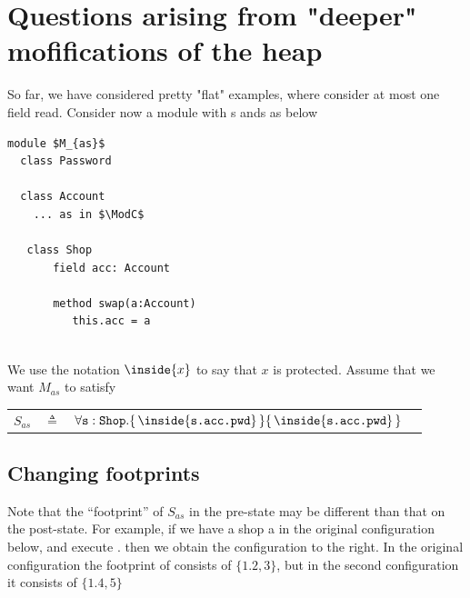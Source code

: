 \newcommand{\balance}{\prg{bal}}
\newcommand{\password}{\prg{pwd}}
\newcommand{\myAccount}{\prg{accnt}}

\section{Questions arising from "deeper" mofifications of the heap}

 So far, we have considered pretty "flat" examples, where consider  at most one field read. Consider now a module with s ands as below

\begin{lstlisting}[mathescape=true, language=Chainmail, frame=lines]
module $M_{as}$        
  class Password
  
  class Account
    ... as in $\ModC$
    
   class Shop
       field acc: Account
       
       method swap(a:Account)
          this.acc = a
    
\end{lstlisting}
%
  
We use the notation ${\inside{x}}$ to say that $x$ is protected. Assume that we want $M_{as}$   to satisfy

 \begin{tabular}{lcll}
 $S_{as}$   & $\triangleq$   &  $\TwoStatesQ {\prg{s}:\prg{Shop}}  {\inside{\prg{s.acc.pwd}}}  {\inside{\prg{s.acc.pwd}}}$
 \end{tabular}
  
\subsection{Changing footprints}  

Note that the ``footprint'' of $S_{as}$ in the pre-state may be different than that on the post-state. For example, if we have a shop a in the original configuration below,  and execute . then we obtain the configuration to the right. In the original configuration the footprint of  consists of $\{ 1. 2, 3\}$, but in the second configuration it consists of $\{ 1. 4, 5\}$
  
